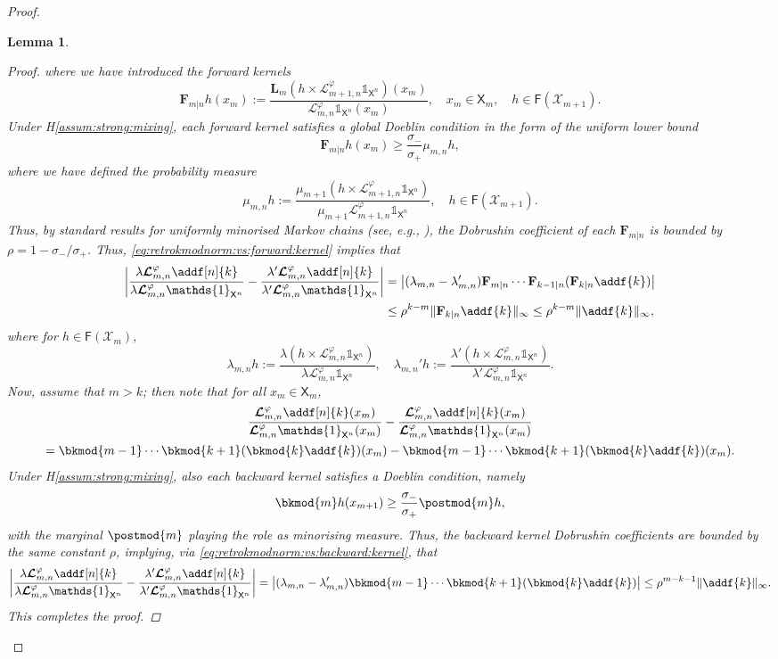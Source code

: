 \documentclass{article}
\newtheorem{lemma}[theorem]{Lemma}
\newcommand{\fk}[2]{\mathbf{F}_{#1 | #2}}
\newcommand{\Xfd}{\mathcal{X}}
\newcommand{\precpar}{\varphi}
\newcommand{\udlow}{\sigma_-}
\newcommand{\udup}{\sigma_+}
\newcommand{\1}{\mathbbm{1}}
\newcommand{\retrokmod}{\boldsymbol{\mathcal{L}}^\precpar}
\newcommand{\uk}[1]{\mathbf{L}_{#1}}
\newcommand{\Xset}{\mathsf{X}}
\newcommand{\bmf}[1]{\set{F}(#1)}
\newcommand{\set}[1]{\mathsf{#1}}
\def\1{\mathds{1}}
\newcommand{\eqdef}{\ensuremath{:=}}
\begin{document}
\begin{proof}
\begin{lemma}
\begin{proof}
where we have introduced the \emph{forward kernels}
$$
\fk{m}{n} h (x_m) \eqdef \frac{\uk{m}(h \times \retrokmod_{m  + 1, n} \1_{\Xset^n})(x_m)}{\retrokmod_{m, n} \1_{\Xset^n} (x_m)}, \quad x_m \in \Xset_m, \quad h \in \bmf{\Xfd_{m + 1}}. 
$$
Under H\ref{assum:strong:mixing}, each forward kernel satisfies a global Doeblin condition in the form of the uniform lower bound 
$$
\fk{m}{n} h (x_m) \geq \frac{\udlow}{\udup} \mu_{m, n} h,  
$$
where we have defined the probability measure 
$$
\mu_{m, n} h \eqdef \frac{\mu_{m + 1}(h \times \retrokmod_{m  + 1, n} \1_{\Xset^n})}{\mu_{m + 1} \retrokmod_{m  + 1, n}  \1_{\Xset^n}}, \quad h \in \bmf{\Xfd_{m + 1}}. 
$$
Thus, by standard results for uniformly minorised Markov chains (see, \emph{e.g.}, \cite[Lemma~4.3.13]{Cappe:2005:IHM:1088883}), the Dobrushin coefficient of each $\fk{m}{n}$ is bounded by $\rho = 1 - \udlow / \udup$. Thus, \eqref{eq:retrokmodnorm:vs:forward:kernel} implies that 
\begin{align*}
\left| \frac{\lambda \retrokmod_{m, n} \addf[n]{k}}{\lambda \retrokmod_{m, n} \1_{\Xset^n}} - \frac{\lambda' \retrokmod_{m, n} \addf[n]{k}}{\lambda' \retrokmod_{m, n} \1_{\Xset^n}} \right| 
&= \left| (\lambda_{m, n} - \lambda_{m, n}') \fk{m}{n} \cdots \fk{k - 1}{n} (\fk{k}{n} \addf{k})
\right| \\
&\leq \rho^{k - m} \| \fk{k}{n} \addf{k} \|_\infty \leq \rho^{k - m} \| \addf{k} \|_\infty, 
\end{align*}
where for $h \in \bmf{\Xfd_m}$, 
$$
\lambda_{m, n} h \eqdef \frac{\lambda(h \times \retrokmod_{m, n} \1_{\Xset^n})}{\lambda \retrokmod_{m, n} \1_{\Xset^n}}, \quad 
\lambda_{m, n}' h \eqdef \frac{\lambda'(h \times \retrokmod_{m, n} \1_{\Xset^n})}{\lambda' \retrokmod_{m, n} \1_{\Xset^n}}. 
$$
Now, assume that $m > k$; then note that for all $x_m \in \Xset_m$, 
\begin{multline} \label{eq:retrokmodnorm:vs:backward:kernel}
\frac{\retrokmod_{m, n} \addf[n]{k}(x_m)}{\retrokmod_{m, n} \1_{\Xset^n}(x_m)} - \frac{\retrokmod_{m, n} \addf[n]{k}(x_m)}{\retrokmod_{m, n} \1_{\Xset^n}(x_m)} \\
 = \bkmod{m - 1} \cdots \bkmod{k + 1}(\bkmod{k} \addf{k})(x_m) - \bkmod{m - 1} \cdots \bkmod{k + 1}(\bkmod{k} \addf{k})(x_m).     
\end{multline}
Under H\ref{assum:strong:mixing}, also each backward kernel satisfies a Doeblin condition, namely   
$$
\bkmod{m} h (x_{m + 1}) \geq \frac{\udlow}{\udup} \postmod{m} h,  
$$
with the marginal $\postmod{m}$ playing the role as minorising measure. Thus, the backward kernel Dobrushin coefficients are bounded by the same constant $\rho$, implying, via \eqref{eq:retrokmodnorm:vs:backward:kernel}, that 
$$
\left| \frac{\lambda \retrokmod_{m, n} \addf[n]{k}}{\lambda \retrokmod_{m, n} \1_{\Xset^n}} - \frac{\lambda' \retrokmod_{m, n} \addf[n]{k}}{\lambda' \retrokmod_{m, n} \1_{\Xset^n}} \right| 
= \left| (\lambda_{m, n} - \lambda_{m, n}') \bkmod{m - 1} \cdots \bkmod{k + 1}(\bkmod{k} \addf{k}) \right| \leq \rho^{m - k - 1} \| \addf{k} \|_\infty. 
$$
This completes the proof. 
\end{proof}
\end{lemma}


\end{proof}
\end{document}
